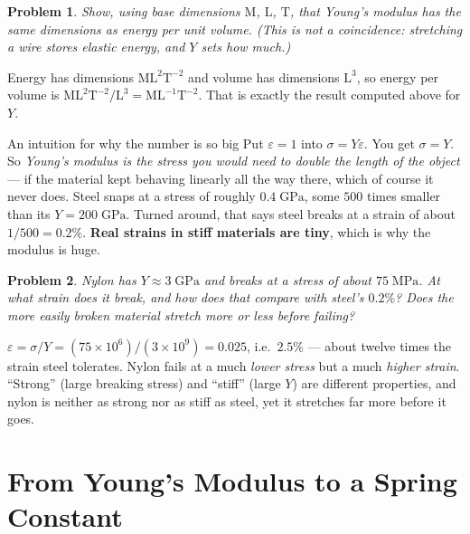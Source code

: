 \documentclass[11pt]{article}
\newcommand{\clearpts}{\addtocounter{tpts}{\value{cpts}} \setcounter{cpts}{0}}
\newcommand{\pts}[1]{\clearpts \setcounter{cpts}{#1}}
\theoremstyle{mystyle}
\newtheorem{pproblem}{Problem}
\begin{document}
\pts{2}
\begin{pproblem}
Show, using base dimensions $\mathrm{M}$, $\mathrm{L}$, $\mathrm{T}$, that Young's modulus has the same dimensions as
energy per unit volume. (This is not a coincidence: stretching a wire stores elastic
energy, and $Y$ sets how much.)
\end{pproblem}
\begin{solution}
Energy has dimensions $\mathrm{M}\mathrm{L}^2\mathrm{T}^{-2}$ and volume has dimensions $\mathrm{L}^3$, so energy per volume
is $\mathrm{M}\mathrm{L}^2\mathrm{T}^{-2}/\mathrm{L}^3 = \mathrm{M}\mathrm{L}^{-1}\mathrm{T}^{-2}$. That is exactly the result computed above for $Y$.
\end{solution}

\begin{psidea}{An intuition for why the number is so big}{}
Put $\varepsilon = 1$ into $\sigma = Y\varepsilon$. You get $\sigma = Y$. So
\emph{Young's modulus is the stress you would need to double the length of the object} ---
if the material kept behaving linearly all the way there, which of course it never does.
Steel snaps at a stress of roughly $0.4\;\mathrm{GPa}$, some $500$ times smaller than its
$Y = 200\;\mathrm{GPa}$. Turned around, that says steel breaks at a strain of about
$1/500 = 0.2\%$. \textbf{Real strains in stiff materials are tiny}, which is why the
modulus is huge.
\end{psidea}

\pts{3}
\begin{pproblem}
Nylon has $Y \approx 3\;\mathrm{GPa}$ and breaks at a stress of about
$75\;\mathrm{MPa}$. At what strain does it break, and how does that compare with steel's
$0.2\%$? Does the more easily broken material stretch more or less before failing?
\end{pproblem}
\begin{solution}
$\varepsilon = \sigma/Y = (75\times10^6)/(3\times10^9) = 0.025$, i.e.\ $2.5\%$ --- about
twelve times the strain steel tolerates. Nylon fails at a much \emph{lower stress} but a
much \emph{higher strain}. ``Strong'' (large breaking stress) and ``stiff'' (large $Y$)
are different properties, and nylon is neither as strong nor as stiff as steel, yet it
stretches far more before it goes.
\end{solution}

\section{From Young's Modulus to a Spring Constant}
\end{document}
